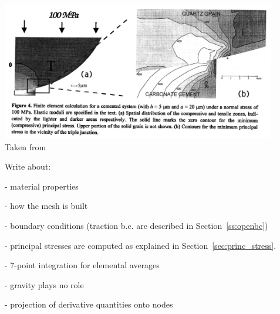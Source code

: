 \begin{center}
\includegraphics[width=12cm]{python_codes/fieldstone_63/images/wowu95}\\
{\captionfont Taken from \cite{wowu95}}
\end{center}

Write about:

- material properties

- how the mesh is built

- boundary conditions (traction b.c. are described in Section~\ref{ss:openbc})

- principal stresses are computed as explained in Section~\ref{sec:princ_stress}.

- 7-point integration for elemental averages

- gravity plays no role

- projection of derivative quantities onto nodes

